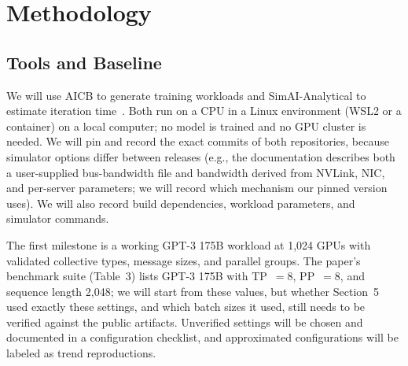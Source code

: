 \documentclass[letterpaper,twocolumn,10pt]{article}
\begin{document}
\section{Methodology}
\subsection{Tools and Baseline}
We will use AICB to generate training workloads and SimAI-Analytical to estimate iteration time~\cite{simai-code,aicb}. Both run on a CPU in a Linux environment (WSL2 or a container) on a local computer; no model is trained and no GPU cluster is needed. We will pin and record the exact commits of both repositories, because simulator options differ between releases (e.g., the documentation describes both a user-supplied bus-bandwidth file and bandwidth derived from NVLink, NIC, and per-server parameters; we will record which mechanism our pinned version uses). We will also record build dependencies, workload parameters, and simulator commands.

The first milestone is a working GPT-3 175B workload at 1,024 GPUs with validated collective types, message sizes, and parallel groups. The paper's benchmark suite (Table~3) lists GPT-3 175B with TP~$=8$, PP~$=8$, and sequence length 2,048; we will start from these values, but whether Section~5 used exactly these settings, and which batch sizes it used, still needs to be verified against the public artifacts. Unverified settings will be chosen and documented in a configuration checklist, and approximated configurations will be labeled as trend reproductions.
\end{document}
